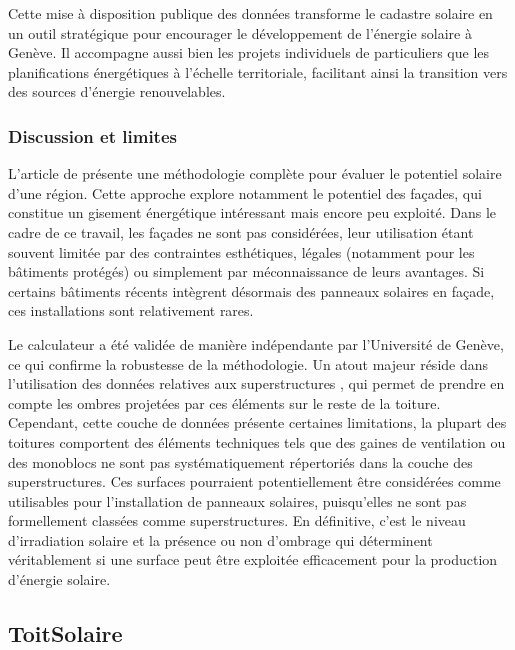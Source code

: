 Cette mise à disposition publique des données transforme le cadastre solaire en un outil stratégique pour encourager le développement de l'énergie solaire à Genève. Il accompagne aussi bien les projets individuels de particuliers que les planifications énergétiques à l'échelle territoriale, facilitant ainsi la transition vers des sources d'énergie renouvelables.

\subsubsection{Discussion et limites}

L'article de \citeauthor{desthieux_solar_2018} \cite{desthieux_solar_2018} présente une méthodologie complète pour évaluer le potentiel solaire d'une région. Cette approche explore notamment le potentiel des façades, qui constitue un gisement énergétique intéressant mais encore peu exploité. Dans le cadre de ce travail, les façades ne sont pas considérées, leur utilisation étant souvent limitée par des contraintes esthétiques, légales (notamment pour les bâtiments protégés) ou simplement par méconnaissance de leurs avantages. Si certains bâtiments récents intègrent désormais des panneaux solaires en façade, ces installations sont relativement rares.

Le calculateur a été validée de manière indépendante par l'Université de Genève, ce qui confirme la robustesse de la méthodologie. Un atout majeur réside dans l'utilisation des données relatives aux superstructures \cite{sitg_superstructures_nodate}, qui permet de prendre en compte les ombres projetées par ces éléments sur le reste de la toiture. Cependant, cette couche de données présente certaines limitations, la plupart des toitures comportent des éléments techniques tels que des gaines de ventilation ou des monoblocs ne sont pas systématiquement répertoriés dans la couche des superstructures. Ces surfaces pourraient potentiellement être considérées comme utilisables pour l'installation de panneaux solaires, puisqu'elles ne sont pas formellement classées comme superstructures. En définitive, c'est le niveau d'irradiation solaire et la présence ou non d'ombrage qui déterminent véritablement si une surface peut être exploitée efficacement pour la production d'énergie solaire.

\subsection{ToitSolaire}

